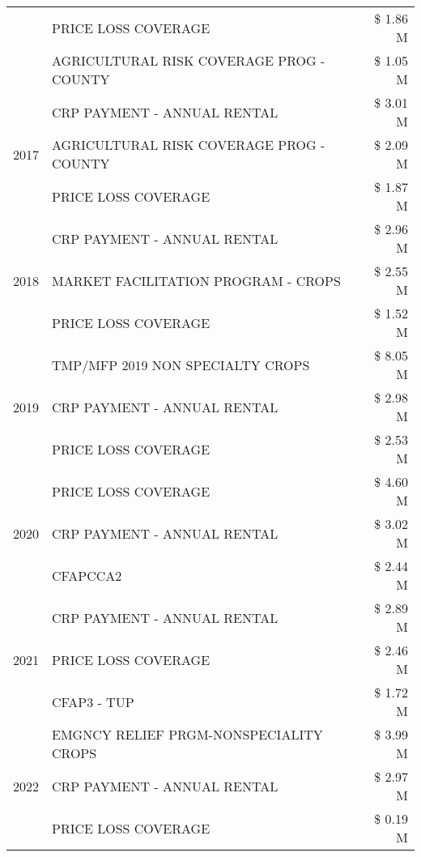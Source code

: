 \begin{tabular}{llr}
 & PRICE LOSS COVERAGE & \$ 1.86 M \\
 & AGRICULTURAL RISK COVERAGE PROG - COUNTY & \$ 1.05 M \\
\cline{1-3}
\multirow[t]{3}{*}{2017} & CRP PAYMENT - ANNUAL RENTAL & \$ 3.01 M \\
 & AGRICULTURAL RISK COVERAGE PROG - COUNTY & \$ 2.09 M \\
 & PRICE LOSS COVERAGE & \$ 1.87 M \\
\cline{1-3}
\multirow[t]{3}{*}{2018} & CRP PAYMENT - ANNUAL RENTAL & \$ 2.96 M \\
 & MARKET FACILITATION PROGRAM - CROPS & \$ 2.55 M \\
 & PRICE LOSS COVERAGE & \$ 1.52 M \\
\cline{1-3}
\multirow[t]{3}{*}{2019} & TMP/MFP 2019 NON SPECIALTY CROPS & \$ 8.05 M \\
 & CRP PAYMENT - ANNUAL RENTAL & \$ 2.98 M \\
 & PRICE LOSS COVERAGE & \$ 2.53 M \\
\cline{1-3}
\multirow[t]{3}{*}{2020} & PRICE LOSS COVERAGE & \$ 4.60 M \\
 & CRP PAYMENT - ANNUAL RENTAL & \$ 3.02 M \\
 & CFAPCCA2 & \$ 2.44 M \\
\cline{1-3}
\multirow[t]{3}{*}{2021} & CRP PAYMENT - ANNUAL RENTAL & \$ 2.89 M \\
 & PRICE LOSS COVERAGE & \$ 2.46 M \\
 & CFAP3 - TUP & \$ 1.72 M \\
\cline{1-3}
\multirow[t]{3}{*}{2022} & EMGNCY RELIEF PRGM-NONSPECIALITY CROPS & \$ 3.99 M \\
 & CRP PAYMENT - ANNUAL RENTAL & \$ 2.97 M \\
 & PRICE LOSS COVERAGE & \$ 0.19 M \\
\cline{1-3}
\bottomrule
\end{tabular}
